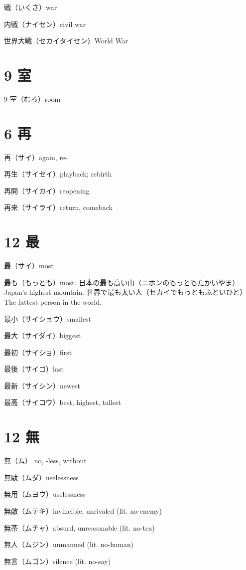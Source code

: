 戦（いくさ）war

内戦（ナイセン）civil war

世界大戦（セカイタイセン）World War

\section{9 室}

9 室（むろ）room

\section{6 再}

再（サイ）again, re-

再生（サイセイ）playback; rebirth

再開（サイカイ）reopening

再来（サイライ）return, comeback

\section{12 最}

最（サイ）most

最も（もっとも）most.
日本の最も高い山（ニホンのもっともたかいやま）Japan's highest mountain.
世界で最も太い人（セカイでもっともふといひと）The fattest person in the world.

最小（サイショウ）smallest

最大（サイダイ）biggest

最初（サイショ）first

最後（サイゴ）last

最新（サイシン）newest

最高（サイコウ）best, highest, tallest

\section{12 無}

無（ム） no, -less, without

無駄（ムダ）uselessness

無用（ムヨウ）uselessness

無敵（ムテキ）invincible, unrivaled (lit. no-enemy)

無茶（ムチャ）absurd, unreasonable (lit. no-tea)

無人（ムジン）unmanned (lit. no-human)

無言（ムゴン）silence (lit. no-say)

